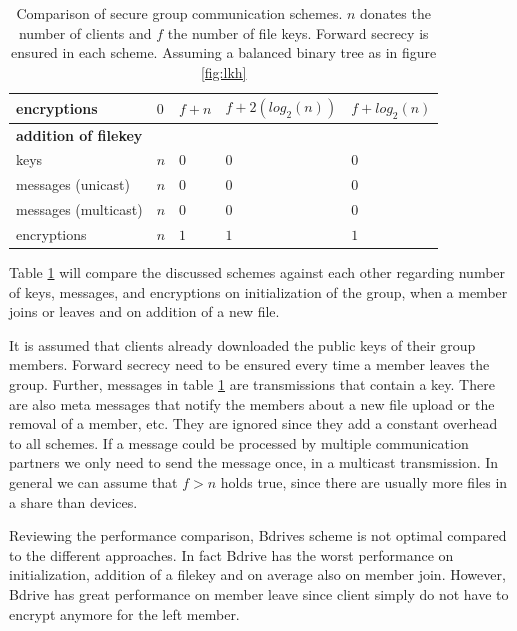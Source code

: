 \begin{table}[!ht]
\begin{tabular}{l 		| l 						| l 							| l 						| l 						}
encryptions 			& $0$						& $f + n$ 						& $f + 2 (log_2(n))$ 		& $f + log_2(n)$	 		\\ %
\hline	
\textbf{addition of filekey}																																\\
keys 					& $n$		 				& $0$							& $0$	 					& $0$		 				\\ %
messages (unicast)		& $n$		 				& $0$	 						& $0$ 						& $0$		 				\\ %
messages (multicast)	& $n$ 						& $0$ 							& $0$ 						& $0$	 					\\ %
encryptions				& $n$ 						& $1$ 							& $1$ 						& $1$		 				\\ %
\hline
\end{tabular}
\caption{Comparison of secure group communication schemes. $n$ donates the number of clients and $f$ the number of file keys. Forward secrecy is ensured in each scheme. Assuming a balanced binary tree as in figure \ref{fig:lkh}}
\label{tab:comparisons}
\end{table}

Table \ref{tab:comparisons} will compare the discussed schemes against each other regarding number of keys, messages, and encryptions on initialization of the group, when a member joins or leaves and on addition of a new file. 

It is assumed that clients already downloaded the public keys of their group members. Forward secrecy need to be ensured every time a member leaves the group.
Further, messages in table \ref{tab:comparisons} are transmissions that contain a key. There are also meta messages that notify the members about a new file upload or the removal of a member, etc.  They are ignored since they add a constant overhead to all schemes.  If a message could be processed by multiple communication partners we only need to send the message once, in a multicast transmission. In general we can assume that $f > n$ holds true, since there are usually more files in a share than devices.

Reviewing the performance comparison, Bdrives scheme is not optimal compared to the different approaches. In fact Bdrive has the worst performance on initialization, addition of a filekey and on average also on member join. However, Bdrive has great performance on member leave since client simply do not have to encrypt anymore for the left member.

